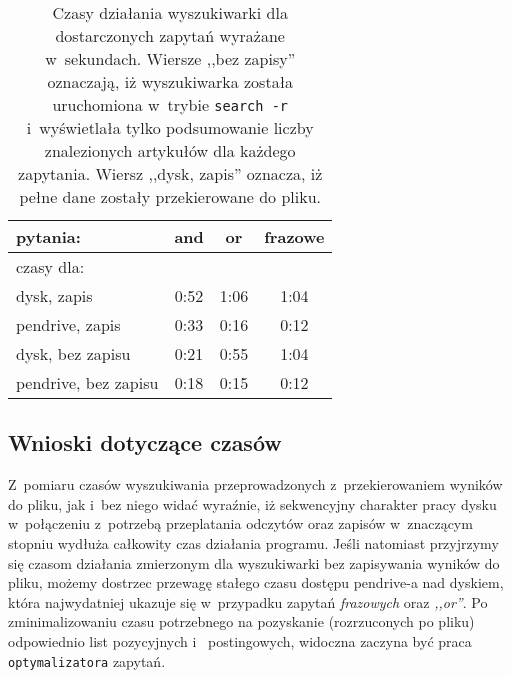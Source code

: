 \documentclass[a4paper,12pt]{article}
\begin{document}
\begin{center}
	\begin{table}
		\begin{tabular}[c]{| l || c | c | c |}
		\hline
		pytania: & and & or & frazowe \\ \hline \hline
		czasy dla: & \multicolumn{3}{|l|}{} \\ \hline
		dysk, zapis & 0:52 & 1:06 & 1:04 \\ \hline
		pendrive, zapis & 0:33 & 0:16 & 0:12 \\ \hline
		dysk, bez zapisu & 0:21 & 0:55 & 1:04 \\ \hline
		pendrive, bez zapisu & 0:18 & 0:15 & 0:12 \\
		\hline
		\end{tabular}
		\caption{Czasy działania wyszukiwarki dla dostarczonych zapytań
		wyrażane w~sekundach.  Wiersze ,,bez zapisy'' oznaczają, iż
		wyszukiwarka została uruchomiona w~trybie \texttt{search -r}
		i~wyświetlała tylko podsumowanie liczby znalezionych artykułów dla
		każdego zapytania. Wiersz ,,dysk, zapis'' oznacza, iż pełne dane
		zostały przekierowane do pliku.}
	\end{table}
\end{center}

\subsection{Wnioski dotyczące czasów}
Z~pomiaru czasów wyszukiwania przeprowadzonych z~przekierowaniem wyników do
pliku, jak i~bez niego widać wyraźnie, iż sekwencyjny charakter pracy dysku
w~połączeniu z~potrzebą przeplatania odczytów oraz zapisów w~znaczącym stopniu
wydłuża całkowity czas działania programu. Jeśli natomiast przyjrzymy się
czasom działania zmierzonym dla wyszukiwarki bez zapisywania wyników do pliku,
możemy dostrzec przewagę stałego czasu dostępu pendrive-a nad dyskiem, która
najwydatniej ukazuje się w~przypadku zapytań \textit{frazowych} oraz
\textit{,,or''}. Po zminimalizowaniu czasu potrzebnego na pozyskanie
(rozrzuconych po pliku) odpowiednio list pozycyjnych i~ postingowych, widoczna
zaczyna być praca \texttt{optymalizatora} zapytań. 
\end{document}
